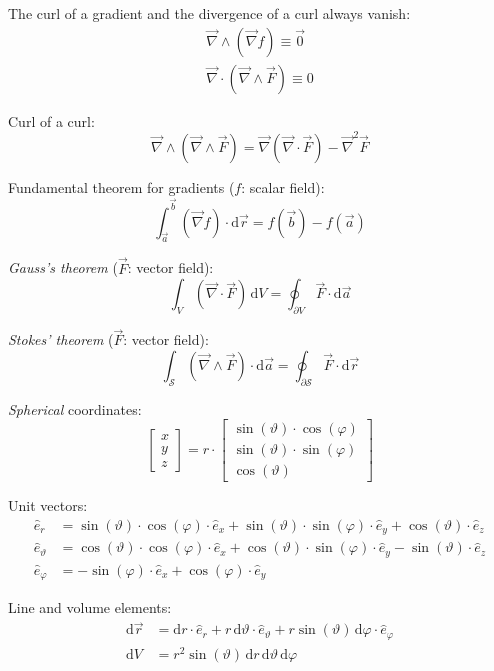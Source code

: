 \documentclass[fontsize=11pt,a4paper]{scrartcl}
\begin{document}
The curl of a gradient and the divergence of a curl always vanish:
\begin{gather*}
	\vec\nabla\wedge(\vec\nabla f)\equiv\vec 0\\
	\vec\nabla\cdot(\vec\nabla\wedge\vec F)\equiv 0
\end{gather*}

Curl of a curl:
\[
	\vec\nabla\wedge(\vec\nabla\wedge\vec F) = \vec\nabla(\vec\nabla\cdot\vec F) - \vec\nabla^2\vec F
\]

Fundamental theorem for gradients ($f$: scalar field):
\[
	\int_{\vec a}^{\vec b} (\vec\nabla f)\cdot\mathrm{d}\vec r = f(\vec b) - f(\vec a)
\]

\emph{Gauss's theorem} ($\vec F$: vector field):
\[
	\int_V(\vec\nabla\cdot\vec F)\,\mathrm{d}V = \oint_{\partial V}\vec F\cdot\mathrm{d}\vec a
\]

\emph{Stokes' theorem} ($\vec F$: vector field):
\[
	\int_\mathcal{S}(\vec\nabla\wedge\vec F)\cdot\mathrm{d}\vec a = \oint_{\partial\mathcal{S}}\vec F\cdot\mathrm{d}\vec r
\]

\emph{Spherical} coordinates:
\[
	\begin{bmatrix}x\\ y\\ z\end{bmatrix} =
	r\cdot\begin{bmatrix}\sin(\vartheta)\cdot\cos(\varphi)\\ \sin(\vartheta)\cdot\sin(\varphi)\\ \cos(\vartheta)\end{bmatrix}
\]

Unit vectors:
\begin{align*}
	\hat e_r &= \sin(\vartheta)\cdot\cos(\varphi)\cdot\hat e_x + \sin(\vartheta)\cdot\sin(\varphi)\cdot\hat e_y + \cos(\vartheta)\cdot\hat e_z\\
	\hat e_\vartheta &= \cos(\vartheta)\cdot\cos(\varphi)\cdot\hat e_x + \cos(\vartheta)\cdot\sin(\varphi)\cdot\hat e_y - \sin(\vartheta)\cdot\hat e_z\\
	\hat e_\varphi &= -\sin(\varphi)\cdot\hat e_x + \cos(\varphi)\cdot\hat e_y
\end{align*}

Line and volume elements:
\begin{align*}
	\mathrm{d}\vec r &= \mathrm{d}r\cdot\hat e_r + r\,\mathrm{d}\vartheta\cdot\hat e_\vartheta + r\sin(\vartheta)\,\mathrm{d}\varphi\cdot\hat e_\varphi\\
	\mathrm{d}V &= r^2\sin(\vartheta)\,\mathrm{d}r\,\mathrm{d}\vartheta\,\mathrm{d}\varphi
\end{align*}
\end{document}

